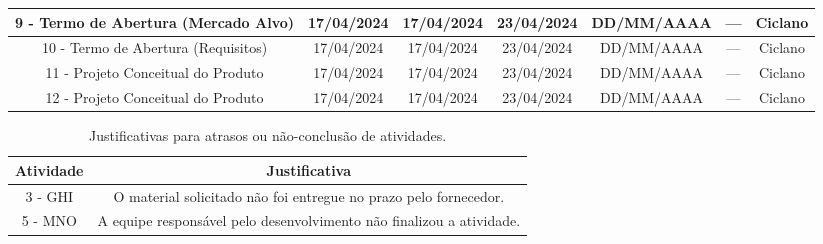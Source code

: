 \begin{landscape}
\begin{table}[htpb]
\begin{center}
\begin{tabular}{|c|c|c|c|c|c|c|}
9 - Termo de Abertura (Mercado 
Alvo)                       & 17/04/2024               & 17/04/2024                & 23/04/2024               & DD/MM/AAAA                & ---                           & Ciclano \\ \hline
10 - Termo de Abertura (Requisitos)                       & 17/04/2024               & 17/04/2024                & 23/04/2024               & DD/MM/AAAA                & ---                           & Ciclano \\ \hline
11 - Projeto Conceitual do Produto                       & 17/04/2024               & 17/04/2024                & 23/04/2024               & DD/MM/AAAA                & ---                           & Ciclano \\ \hline
12 - Projeto Conceitual do Produto                       & 17/04/2024               & 17/04/2024                & 23/04/2024               & DD/MM/AAAA                & ---                           & Ciclano \\ \hline
\end{tabular}
\end{center}
\end{table}



\begin{table}[htpb]
\begin{center}
\caption{Justificativas para atrasos ou não-conclusão de atividades.}
\begin{tabular}{|c|c|} \hline
\textbf{Atividade} & \textbf{Justificativa}  \\ \hline 
    3 - GHI &
    O material solicitado não foi entregue no prazo pelo fornecedor. \\ \hline
    5 - MNO &
    A equipe responsável pelo desenvolvimento não finalizou a atividade. \\ \hline
\end{tabular}
\end{center}
\end{table}






\end{landscape}
